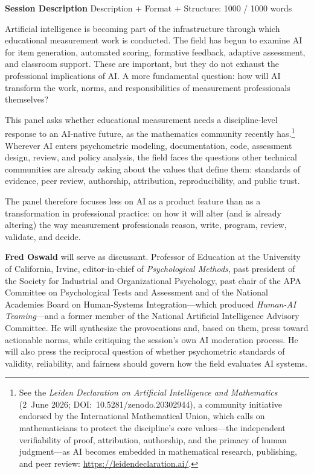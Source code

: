 \documentclass[11pt]{article}
\newcommand{\fieldlabel}[2][]{%
  \par\addvspace{1.25em}\Needspace{8\baselineskip}%
  \noindent\begin{minipage}{\linewidth}%
    {\NotoHeading\bfseries\large\color{ContentPrimary}#2}%
    \hfill{\normalfont\footnotesize\color{ContentSecondary}#1}%
  \end{minipage}\par
  \vspace{0.2em}{\color{BorderModerate}\rule{\linewidth}{0.4pt}}\par
  \vspace{0.55em}%
}
\begin{document}
\fieldlabel[Description + Format + Structure: 1000 / 1000 words]{Session Description}

Artificial intelligence is becoming part of the infrastructure through which
educational measurement work is conducted. The field has begun to examine
AI for item generation, automated scoring, formative feedback, adaptive
assessment, and classroom support. These are important, but they do not exhaust
the professional implications of AI. A more fundamental question: how will AI
transform the work, norms, and responsibilities of measurement professionals
themselves?

This panel asks whether educational measurement needs a discipline-level
response to an AI-native future, as the mathematics community recently
has.\footnote{See the \emph{Leiden Declaration on Artificial
Intelligence and Mathematics} (2~June 2026; DOI:~10.5281/zenodo.20302944),
a community initiative endorsed by the International Mathematical Union, which
calls on mathematicians to protect the discipline's core values---the
independent verifiability of proof, attribution, authorship, and the primacy of
human judgment---as AI becomes embedded in mathematical research, publishing,
and peer review: \url{https://leidendeclaration.ai/}.} Wherever AI enters psychometric
modeling, documentation, code, assessment design, review, and policy analysis,
the field faces the questions other technical communities are already asking
about the values that define them: standards of evidence, peer review,
authorship, attribution, reproducibility, and public trust.

The panel therefore focuses less on AI as a product feature than as a
transformation in professional practice: on how it will alter (and is already altering) the way
measurement professionals reason, write, program, review, validate, and decide.

\textbf{Fred Oswald} will serve as discussant. Professor of Education at the
University of California, Irvine, editor-in-chief of \emph{Psychological
Methods}, past president of the Society for Industrial and Organizational
Psychology, past chair of the APA Committee on Psychological Tests and
Assessment and of the National Academies Board on Human-Systems
Integration---which produced \emph{Human-AI Teaming}---and a former member of the National Artificial Intelligence
Advisory Committee. He will synthesize the provocations and, based on them,
press toward actionable norms, while critiquing the session's own AI moderation
process. He will also press the reciprocal question of whether psychometric
standards of validity, reliability, and fairness should govern how the field
evaluates AI systems.
\end{document}
